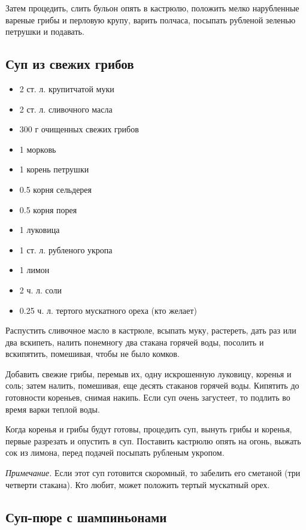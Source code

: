 Затем процедить, слить бульон опять в кастрюлю, положить мелко нарубленные вареные грибы и перловую крупу, варить полчаса, посыпать рубленой зеленью петрушки и подавать.

\subsection{Суп из свежих грибов}\label{18sup-svezh-grib}

\begin{itemize}
	\item 2 ст. л. крупитчатой муки
    \item 2 ст. л. сливочного масла 
    \item 300 г очищенных свежих грибов
    \item 1 морковь
    \item 1 корень петрушки
    \item 0.5 корня сельдерея
    \item 0.5 корня порея
    \item 1 луковица
    \item 1 ст. л. рубленого укропа
    \item 1 лимон
    \item 2 ч. л. соли
    \item 0.25 ч. л. тертого мускатного ореха (кто желает)
\end{itemize}

Распустить сливочное масло в кастрюле, всыпать муку, растереть, дать раз или два вскипеть, налить понемногу два стакана горячей воды, посолить и вскипятить, помешивая, чтобы не было комков.

Добавить свежие грибы, перемыв их, одну искрошенную луковицу, коренья и соль; затем налить, помешивая, еще десять стаканов горячей воды. Кипятить до готовности кореньев, снимая накипь. Если суп очень загустеет, то подлить во время варки теплой воды.

Когда коренья и грибы будут готовы, процедить суп, вынуть грибы и коренья, первые разрезать и опустить в суп. Поставить кастрюлю опять на огонь, выжать сок из лимона, перед подачей посыпать рубленым укропом.

\emph{Примечание.} Если этот суп готовится скоромный, то забелить его сметаной (три четверти стакана). Кто любит, может положить тертый мускатный орех.

\subsection{Суп-пюре с шампиньонами}\label{19pure-shamp}


